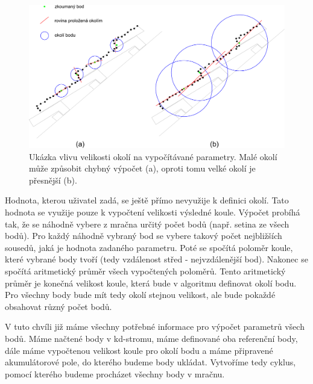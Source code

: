 \documentclass[11pt,twoside,a4paper]{book}
\begin{document}
\begin{figure}[ht]
\begin{center}
\includegraphics[width=\textwidth]{figures/strecha-all}
\caption{Ukázka vlivu velikosti okolí na vypočítávané parametry. Malé okolí může způsobit chybný výpočet (a), oproti tomu velké okolí je přesnější (b).}
\label{fig:strecha}
\end{center}
\end{figure}

Hodnota, kterou uživatel zadá, se ještě přímo nevyužije k definici okolí. Tato hodnota se využije pouze k vypočtení velikosti výsledné koule. Výpočet probíhá tak, že se náhodně vybere z mračna určitý počet bodů (např. setina ze všech bodů). Pro každý náhodně vybraný bod se vybere takový počet nejbližších sousedů, jaká je hodnota zadaného parametru. Poté se spočítá poloměr koule, které vybrané body tvoří (tedy vzdálenost střed - nejvzdálenější bod). Nakonec se spočítá aritmetický průměr všech vypočtených poloměrů. Tento aritmetický průměr je konečná velikost koule, která bude v algoritmu definovat okolí bodu. Pro všechny body bude mít tedy okolí stejnou velikost, ale bude pokaždé obsahovat různý počet bodů.

V tuto chvíli již máme všechny potřebné informace pro výpočet parametrů všech bodů. Máme načtené body v kd-stromu, máme definované oba referenční body, dále máme vy\-po\-čte\-nou velikost koule pro okolí bodu a máme připravené akumulátorové pole, do kterého budeme body ukládat. Vytvoříme tedy cyklus, pomocí kterého budeme procházet všechny body v mračnu.
\end{document}
